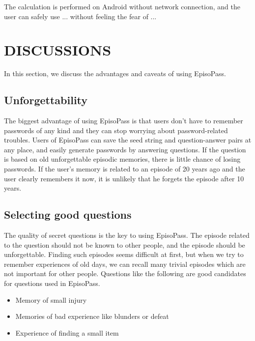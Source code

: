 \documentclass{article}
\begin{document}
The calculation is performed on Android without network connection,
and the user can safely use ...
without feeling the fear of ...


\section{DISCUSSIONS}

In this section, we discuss the advantages and caveats of
using EpisoPass.

\subsection{Unforgettability}

The biggest advantage of using EpisoPass is that
users don't have to remember passwords of any kind and
they can stop worrying about password-related troubles.
%
Users of EpisoPass can save the seed string and question-answer
pairs at any place, and easily generate passwords by answering questions.
If the question is based on old unforgettable episodic memories,
there is little chance of losing passwords.
If the user's memory is related to an episode of 20 years ago and the user clearly
remembers it now, it is unlikely that he forgets the episode after 10 years.

\subsection{Selecting good questions}


The quality of secret questions is the key to using EpisoPass.
The episode related to the question should not be known to other people,
and the episode should be unforgettable.
%
Finding such episodes seems difficult at first, but
when we try to remember experiences of old days,
we can recall many trivial episodes which are not
important for other people.
%
Questions like the following are good candidates for
questions used in EpisoPass.

\begin{itemize}
\item Memory of small injury

\vspace{-1mm}
\item Memories of bad experience like blunders or defeat

\vspace{-1mm}
\item Experience of finding a small item
\end{itemize}
\end{document}
